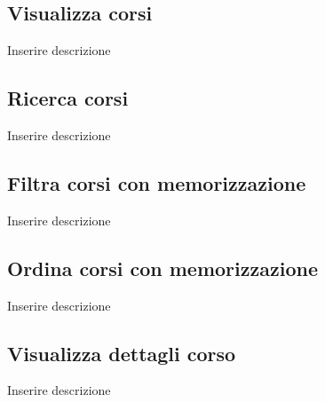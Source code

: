 \begin{figure}
	\subsection{ Visualizza corsi}
	\centering
	\caption{Inserire descrizione}
	\label{fig:prova}
\end{figure}


\begin{figure}
	\subsection{ Ricerca corsi}
	\centering
	\caption{Inserire descrizione}
	\label{fig:prova}
\end{figure}


\begin{figure}
	\subsection{Filtra corsi con memorizzazione}
	\centering
	\caption{Inserire descrizione}
	\label{fig:prova}
\end{figure}


\begin{figure}
	\subsection{Ordina corsi con memorizzazione }
	\centering
	\caption{Inserire descrizione}
	\label{fig:prova}
\end{figure}


\begin{figure}
	\subsection{Visualizza dettagli corso}
	\centering
	\caption{Inserire descrizione}
	\label{fig:prova}
\end{figure}

